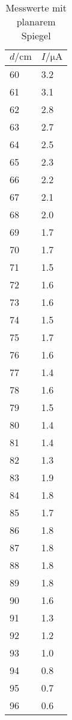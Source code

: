 \begin{table}[H]
  \centering
  \caption{Messwerte mit planarem Spiegel}
  \label{tab:tabe2}
    \begin{tabular}{l l}
    \toprule
    $ d / \si{\centi\meter} $ & $ I / \si{\micro\ampere} $ \\
    \midrule
    60 & 3.2  \\
    61 & 3.1  \\
    62 & 2.8  \\
    63 & 2.7  \\
    64 & 2.5  \\
    65 & 2.3  \\
    66 & 2.2  \\
    67 & 2.1  \\
    68 & 2.0  \\
    69 & 1.7  \\
    70 & 1.7  \\
    71 & 1.5  \\
    72 & 1.6  \\
    73 & 1.6  \\
    74 & 1.5  \\
    75 & 1.7  \\
    76 & 1.6  \\
    77 & 1.4  \\
    78 & 1.6  \\
    79 & 1.5  \\
    80 & 1.4  \\
    81 & 1.4  \\
    82 & 1.3  \\
    83 & 1.9  \\
    84 & 1.8  \\
    85 & 1.7  \\
    86 & 1.8  \\
    87 & 1.8  \\
    88 & 1.8  \\
    89 & 1.8  \\
    90 & 1.6  \\
    91 & 1.3  \\
    92 & 1.2  \\
    93 & 1.0  \\
    94 & 0.8  \\
    95 & 0.7  \\
    96 & 0.6  \\


          \bottomrule
        \end{tabular}
    \end{table}
